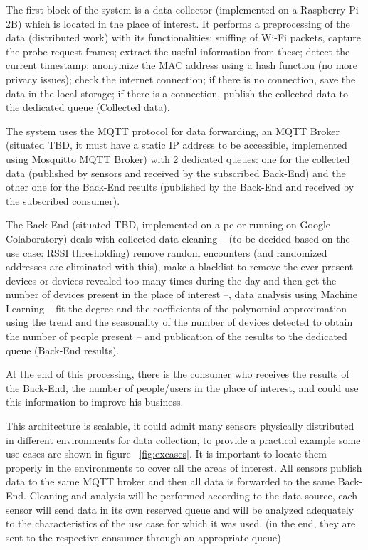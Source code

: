 The first block of the system is a data collector (implemented on a Raspberry Pi 2B) which is located in the place of interest. It performs a preprocessing of the data (distributed work) with its functionalities: sniffing of Wi-Fi packets, capture the probe request frames; extract the useful information from these; detect the current timestamp; anonymize the MAC address using a hash function (no more privacy issues); check the internet connection; if there is no connection, save the data in the local storage; if there is a connection, publish the collected data to the dedicated queue (Collected data).

The system uses the MQTT protocol for data forwarding, an MQTT Broker (situated TBD, it must have a static IP address to be accessible, implemented using Mosquitto MQTT Broker) with 2 dedicated queues: one for the collected data (published by sensors and received by the subscribed Back-End) and the other one for the Back-End results (published by the Back-End and received by the subscribed consumer).

The Back-End (situated TBD, implemented on a pc or running on Google Colaboratory) deals with collected data cleaning -- (to be decided based on the use case: RSSI thresholding) remove random encounters (and randomized addresses are eliminated with this), make a blacklist to remove the ever-present devices or devices revealed too many times during the day and then get the number of devices present in the place of interest --, data analysis using Machine Learning -- fit the degree and the coefficients of the polynomial approximation using the trend and the seasonality of the number of devices detected to obtain the number of people present -- and publication of the results to the dedicated queue (Back-End results).

At the end of this processing, there is the consumer who receives the results of the Back-End, the number of people/users in the place of interest, and could use this information to improve his business.

This architecture is scalable, it could admit many sensors physically distributed in different environments for data collection, to provide a practical example some use cases are shown in figure ~\ref{fig:excases}.  It is important to locate them properly in the environments to cover all the areas of interest. All sensors publish data to the same MQTT broker and then all data is forwarded to the same Back-End. Cleaning and analysis will be performed according to the data source, each sensor will send data in its own reserved queue and will be analyzed adequately to the characteristics of the use case for which it was used. (in the end, they are sent to the respective consumer through an appropriate queue)

